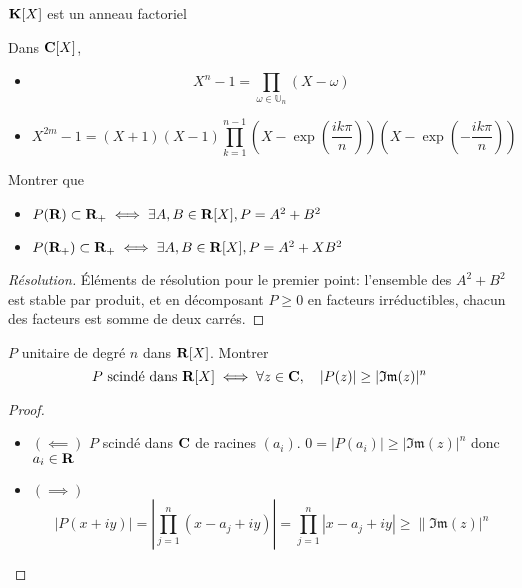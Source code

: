 \begin{thm}
    $\mathbf K[X]$ est un anneau factoriel
\end{thm}

\begin{ex}
    Dans $\mathbf C[X]$, \begin{itemize}
        \item \[
                X^n-1=\prod_{\omega\in\mathbb U_n}(X-\omega)
            \]
        \item \[
                X^{2m}-1=(X+1)(X-1)\prod_{k=1}^{n-1} \left( X-\exp \left( \frac{ik\pi}n \right) \right) \left( X-\exp \left( -\frac{ik\pi}n \right) \right)
            \]
    \end{itemize}
\end{ex}

\begin{exo} Montrer que
    \begin{itemize}
        \item $P(\mathbf R)\subset \mathbf R_+ \iff \exists A, B\in\mathbf R[X], P=A^2+B^2$
        \item $P(\mathbf R_+)\subset \mathbf R_+\iff \exists A, B\in\mathbf R[X], P=A^2+XB^2$
    \end{itemize}
\end{exo}

\begin{proof}[Résolution]
    Éléments de résolution pour le premier point: l'ensemble des $A^2+B^2$ est stable par produit, et en décomposant $P\geq 0$ en facteurs irréductibles, chacun des facteurs est somme de deux carrés.
\end{proof}

\begin{exo}
    $P$ unitaire de degré $n$ dans $\mathbf R[X]$. Montrer \[
        P\text{ scindé dans }\mathbf R[X] \iff \forall z\in\mathbf C, \quad |P(z)|\geq |\mathfrak{Im}(z)|^n
    \]
\end{exo}

\begin{proof}~
    \begin{itemize}
        \item $(\impliedby)$ $P$ scindé dans $\mathbf C$ de racines $(a_i)$. $0=|P(a_i)|\geq |\mathfrak{Im}(z)|^n$ donc $a_i\in\mathbf R$
        \item $(\implies)$ \[
                \left| P(x+iy) \right|= \left| \prod_{j=1}^n(x-a_j+iy) \right|=\prod_{j=1}^n|x-a_j+iy|\geq \|\mathfrak{Im}(z)|^n
            \]
    \end{itemize}
\end{proof}


